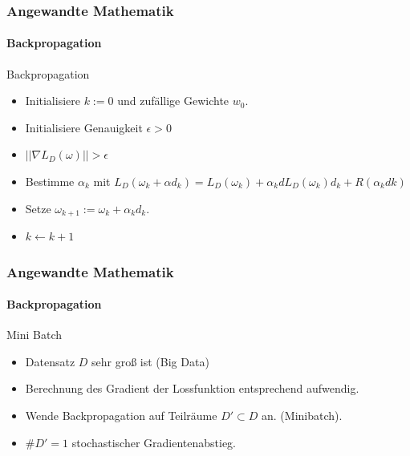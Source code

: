\documentclass{beamer}
\begin{document}
\begin{frame}
    \frametitle{Angewandte Mathematik}
\framesubtitle{Backpropagation}
    \begin{block}{Backpropagation}
\begin{itemize}
\item  Initialisiere $k:=0$ und zufällige Gewichte $w_0$.
\item \pause Initialisiere Genauigkeit $\epsilon > 0$
\item \pause   {} {$|| \nabla L_D(\omega) || > \epsilon$}  
\item \pause Bestimme $\alpha_k$  mit $ L_D(\omega_k + \alpha d_k) =  L_D(\omega_k) + \alpha_k d L_D(\omega_k)d_k + R( \alpha_k dk)$ 
\item \pause  Setze $\omega_{k+1} := \omega_k  + \alpha_k d_k$. 
\item \pause $k \leftarrow k+1$
\end{itemize}
\end{block}
 \end{frame}

\begin{frame}
    \frametitle{Angewandte Mathematik}
\framesubtitle{Backpropagation}
    \begin{block}{Mini Batch}
\begin{itemize}
\item   Datensatz $D$ sehr groß ist (Big Data)
\item \pause Berechnung des Gradient der Lossfunktion entsprechend aufwendig. 
\item \pause Wende Backpropagation auf Teilräume $D' \subset D$ an. (Minibatch).
\item \pause $\#D' = 1$ stochastischer Gradientenabstieg.
\end{itemize}

\end{block}
 \end{frame}
\end{document}
